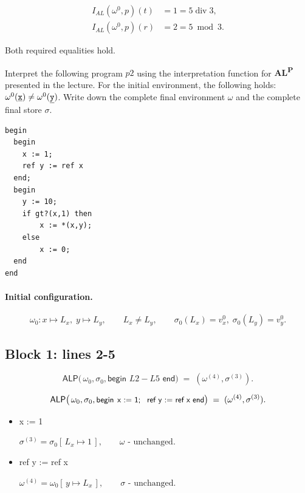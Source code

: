 \documentclass[10pt, a4paper]{article}
\begin{document}
\begin{enumerate}
\[
\begin{aligned}
I_{AL}(\omega^{0},p)(t) &= 1 = 5 \operatorname{div} 3,\\[4pt]
I_{AL}(\omega^{0},p)(r) &= 2 = 5 \bmod 3.
\end{aligned}
\]

Both required equalities hold.
    
    
\end{enumerate}
Interpret the following program $p2$ using the interpretation function for \textbf{AL\textsuperscript{P}} presented in the lecture. For the initial environment, the following holds: $\omega^0(\underline{\texttt{x}}) \neq \omega^0(\underline{\texttt{y}})$. Write down the complete final environment $\omega$ and the complete final store $\sigma$.
\lstset{frame=single,numbers=left}
\begin{lstlisting}
begin
  begin
    x := 1;
    ref y := ref x
  end;
  begin
    y := 10;
    if gt?(x,1) then
        x := *(x,y);
    else
        x := 0;
  end
end
\end{lstlisting}

\paragraph{Initial configuration.}
\[
  \omega_{0} : x \mapsto L_{x},\; y \mapsto L_{y},
  \qquad L_{x}\neq L_{y},
  \qquad
  \sigma_{0}(L_{x}) = v^{0}_{x},\;
  \sigma_{0}(L_{y}) = v^{0}_{y}.
\]

\subsection*{Block 1: lines 2-5}
\[
  \mathsf{ALP}\bigl(\,\omega_{0},\sigma_{0},
      \textsf{begin } L2-L5  \textsf{ end}\bigr)
      \;=\; (\omega^{(4)},\sigma^{(3)}).
\]

\[
  \mathsf{ALP}\bigl(\,\omega_{0},\sigma_{0},
      \textsf{\small begin \kern1pt x := 1; \, ref y := ref x  end}\bigr)
      \;=\; (\omega^{(4)},\sigma^{(3)}).
\]

\begin{itemize}
  \item[\bfseries L3.]
        \textsf{x := 1}

        \(
          \sigma^{(3)} = \sigma_{0}[\,L_{x}\!\mapsto 1\,],
          \qquad
          \omega\text{ - unchanged}.
        \)

  \item[\bfseries L4.]
        \textsf{ref y := ref x}

        \(
          \omega^{(4)} = \omega_{0}[\,y\!\mapsto L_{x}\,],
          \qquad
          \sigma\text{ - unchanged}.
        \)
\end{itemize}
\end{document}
